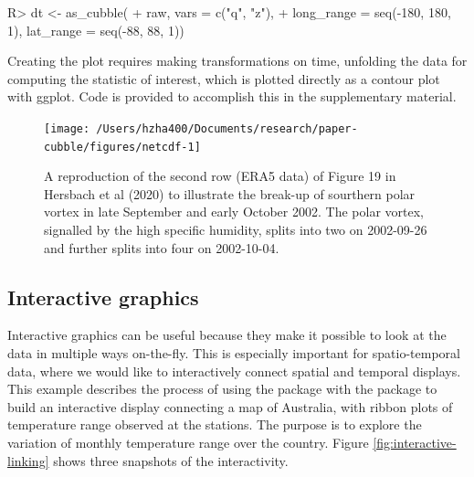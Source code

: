 \documentclass[
  shortnames]{jss}
\begin{document}
\begin{CodeChunk}
\begin{CodeInput}
R> dt <- as_cubble(
+   raw, vars = c("q", "z"),
+   long_range = seq(-180, 180, 1), lat_range = seq(-88, 88, 1))
\end{CodeInput}
\end{CodeChunk}

Creating the plot requires making transformations on time, unfolding the data for computing the statistic of interest, which is plotted directly as a contour plot with ggplot. Code is provided to accomplish this in the supplementary material.

\begin{CodeChunk}
\begin{figure}

{\centering \texttt{[image: /Users/hzha400/Documents/research/paper-cubble/figures/netcdf-1]} 

}

\caption[A reproduction of the second row (ERA5 data) of Figure 19 in Hersbach et al (2020) to illustrate the break-up of sourthern polar vortex in late September and early October 2002]{A reproduction of the second row (ERA5 data) of Figure 19 in Hersbach et al (2020) to illustrate the break-up of sourthern polar vortex in late September and early October 2002. The polar vortex, signalled by the high specific humidity, splits into two on 2002-09-26 and further splits into four on 2002-10-04.}\label{fig:netcdf}
\end{figure}
\end{CodeChunk}

\hypertarget{interactive-graphics-1}{%
\subsection{Interactive graphics}\label{interactive-graphics-1}}

Interactive graphics can be useful because they make it possible to look at the data in multiple ways on-the-fly. This is especially important for spatio-temporal data, where we would like to interactively connect spatial and temporal displays. This example describes the process of using the  package with the  package to build an interactive display connecting a map of Australia, with ribbon plots of temperature range observed at the stations. The purpose is to explore the variation of monthly temperature range over the country. Figure \ref{fig:interactive-linking} shows three snapshots of the interactivity.
\end{document}
